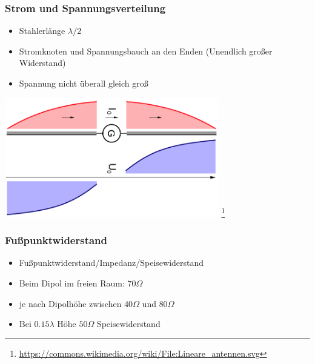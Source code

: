 \begin{frame}
    \frametitle{Strom und Spannungsverteilung}
	\begin{itemize}
		\item Stahlerlänge $\lambda / 2$
		\item Stromknoten und Spannungsbauch an den Enden (Unendlich großer Widerstand)
        \item Spannung nicht überall gleich groß
    \end{itemize}
    \begin{center}
        \includegraphics[width=0.7\textwidth]{e11/DipolUI.png}
        \footnote{\tiny \url{https://commons.wikimedia.org/wiki/File:Lineare_antennen.svg}}
	\end{center}
\end{frame}

\begin{frame}
    \frametitle{Fußpunktwiderstand}
    \begin{center}
	\begin{itemize}
		\item Fußpunktwiderstand/Impedanz/Speisewiderstand
		\item Beim Dipol im freien Raum: $70 \Omega$
		\item je nach Dipolhöhe zwischen $40  \Omega$ und $80  \Omega$
		\item  Bei $0.15 \lambda$ Höhe $50  \Omega$ Speisewiderstand 
    \end{itemize}
 	\end{center}
\end{frame}


